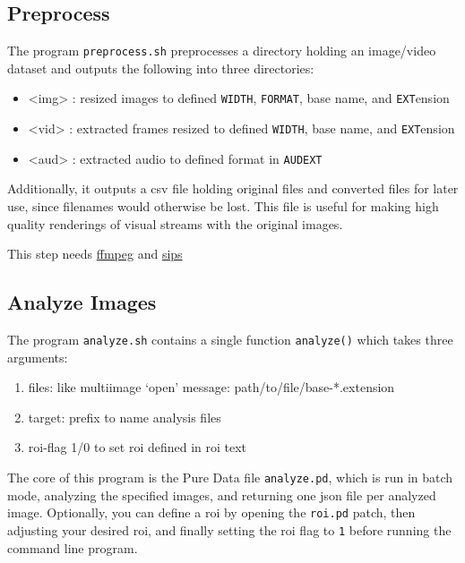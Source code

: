 \subsection{Preprocess}

The program \texttt{preprocess.sh} preprocesses a directory holding an image/video dataset and outputs the following into three directories:

\begin{itemize}
  \singlespacing
\item <img> : resized images to defined \texttt{WIDTH}, \texttt{FORMAT}, base name, and \texttt{EXT}ension
\item <vid> : extracted frames resized to defined \texttt{WIDTH}, base name, and \texttt{EXT}ension
\item <aud> : extracted audio to defined format in \texttt{AUDEXT}
\end{itemize}

Additionally, it outputs a \gls{csv} file holding original files and converted files for later use, since filenames would otherwise be lost. This file is useful for making high quality renderings of visual streams with the original images. 

This step needs \href{https://ffmpeg.org/ffmpeg.html}{ffmpeg} and \href{https://ss64.com/osx/sips.html}{sips}


\subsection{Analyze Images}

The program \texttt{analyze.sh} contains a single function \texttt{analyze()}  which takes three arguments:

\begin{enumerate}
\singlespacing
\item files: like multiimage `open' message: path/to/file/base-*.extension
\item target: prefix to name analysis files
\item roi-flag 1/0 to set roi defined in roi text
\end{enumerate}

The core of this program is the Pure Data file \texttt{analyze.pd}, which is run in batch mode, analyzing the specified images, and returning one \gls{json} file per analyzed image. Optionally, you can define a \gls{roi} by opening the \texttt{roi.pd} patch, then adjusting your desired \gls{roi}, and finally setting the \gls{roi} flag to \texttt{1} before running the command line program.

